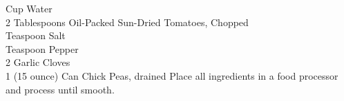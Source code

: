 { Cup Water \\
 2 Tablespoons Oil-Packed Sun-Dried Tomatoes, Chopped \\
  Teaspoon Salt \\
  Teaspoon Pepper \\
 2 Garlic Cloves \\
 1 (15 ounce) Can Chick Peas, drained}
{Place all ingredients in a food processor and process until smooth.}

